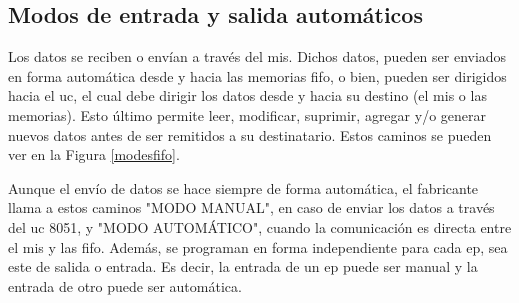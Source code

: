 %	

\subsection{Modos de entrada y salida automáticos}
	
	Los datos se reciben o envían a través del \acrshort{mis}. Dichos datos, pueden ser enviados en forma automática desde y hacia las memorias \acrshort{fifo}, o bien, pueden ser dirigidos hacia el \acrshort{uc}, el cual debe dirigir los datos desde y hacia su destino (el \acrshort{mis} o las memorias). Esto último permite leer, modificar, suprimir, agregar y/o generar nuevos datos antes de ser remitidos a su destinatario. Estos caminos se pueden ver en la Figura \ref{modesfifo}.%
	
	Aunque el envío de datos se hace siempre de forma automática, el fabricante llama a estos caminos "MODO MANUAL", en caso de enviar los datos a través del \acrshort{uc} 8051, y "MODO AUTOMÁTICO", cuando la comunicación es directa entre el \acrshort{mis} y las \acrshort{fifo}. Además, se programan en forma independiente para cada \acrshort{ep}, sea este de salida o entrada. Es decir, la entrada de un \acrshort{ep} puede ser manual y la entrada de otro puede ser automática.%
	
